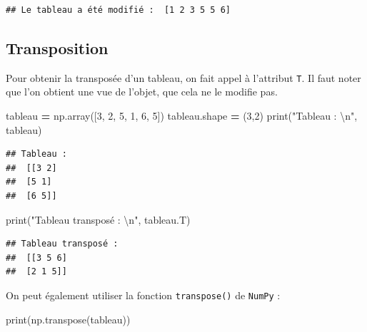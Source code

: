 \documentclass[12pt,]{book}
\newenvironment{Shaded}{\begin{snugshade}}{\end{snugshade}}
\newcommand{\DecValTok}[1]{\textcolor[rgb]{0.00,0.00,0.81}{#1}}
\newcommand{\CharTok}[1]{\textcolor[rgb]{0.31,0.60,0.02}{#1}}
\newcommand{\StringTok}[1]{\textcolor[rgb]{0.31,0.60,0.02}{#1}}
\newcommand{\OperatorTok}[1]{\textcolor[rgb]{0.81,0.36,0.00}{\textbf{#1}}}
\newcommand{\BuiltInTok}[1]{#1}
\newcommand{\NormalTok}[1]{#1}
\numberwithin{equation}{section}
\numberwithin{countremarque}{section}
\begin{document}
\begin{lstlisting}
## Le tableau a été modifié :  [1 2 3 5 5 6]
\end{lstlisting}

\subsection{Transposition}\label{transposition-tableau}

Pour obtenir la transposée d'un tableau, on fait appel à l'attribut
\texttt{T}. Il faut noter que l'on obtient une vue de l'objet, que cela
ne le modifie pas.

\begin{Shaded}
\begin{Highlighting}[]
\NormalTok{tableau }\OperatorTok{=}\NormalTok{ np.array([}\DecValTok{3}\NormalTok{, }\DecValTok{2}\NormalTok{, }\DecValTok{5}\NormalTok{, }\DecValTok{1}\NormalTok{, }\DecValTok{6}\NormalTok{, }\DecValTok{5}\NormalTok{])}
\NormalTok{tableau.shape }\OperatorTok{=}\NormalTok{ (}\DecValTok{3}\NormalTok{,}\DecValTok{2}\NormalTok{)}
\BuiltInTok{print}\NormalTok{(}\StringTok{"Tableau : }\CharTok{\textbackslash{}n}\StringTok{"}\NormalTok{, tableau)}
\end{Highlighting}
\end{Shaded}

\begin{lstlisting}
## Tableau : 
##  [[3 2]
##  [5 1]
##  [6 5]]
\end{lstlisting}

\begin{Shaded}
\begin{Highlighting}[]
\BuiltInTok{print}\NormalTok{(}\StringTok{"Tableau transposé : }\CharTok{\textbackslash{}n}\StringTok{"}\NormalTok{, tableau.T)}
\end{Highlighting}
\end{Shaded}

\begin{lstlisting}
## Tableau transposé : 
##  [[3 5 6]
##  [2 1 5]]
\end{lstlisting}

On peut également utiliser la fonction \texttt{transpose()} de
\texttt{NumPy} :

\begin{Shaded}
\begin{Highlighting}[]
\BuiltInTok{print}\NormalTok{(np.transpose(tableau))}
\end{Highlighting}
\end{Shaded}
\end{document}
